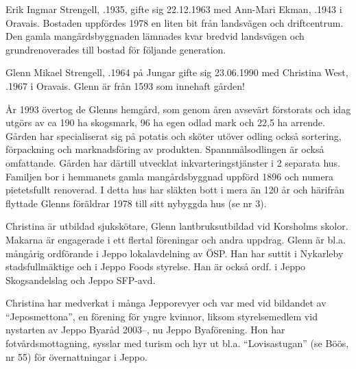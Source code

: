 
Erik Ingmar Strengell, .1935, gifte sig 22.12.1963 med Ann-Mari Ekman, .1943 i Oravais. Bostaden uppfördes 1978 en liten bit från landsvägen och driftcentrum. Den gamla mangårdsbyggnaden lämnades kvar bredvid landsvägen och grundrenoverades till bostad för följande generation.\jhvspace{}






Glenn Mikael Strengell, .1964 på Jungar gifte sig 23.06.1990 med Christina West, .1967 i  Oravais. Glenn är  från 1593 som innehaft gården!

År 1993 övertog de Glenns hemgård, som genom åren avsevärt förstorats och idag utgörs av ca 190 ha skogsmark, 96 ha egen odlad mark och 22,5 ha arrende. Gården har specialiserat sig på potatis och sköter utöver odling också sortering, förpackning och marknadsföring av produkten. Spannmålsodlingen är också omfattande. Gården har därtill utvecklat inkvarteringstjänster i 2 separata hus. Familjen bor i hemmanets gamla mangårdsbyggnad uppförd 1896 och numera pietetsfullt renoverad. I detta hus har släkten bott i mera än 120 år och härifrån flyttade Glenns föräldrar 1978 till sitt nybyggda hus (se nr 3).

Christina är utbildad sjukskötare, Glenn lantbruksutbildad vid Korsholms skolor. Makarna är engagerade i ett flertal föreningar och andra uppdrag. Glenn är bl.a. mångårig ordförande i Jeppo lokalavdelning av ÖSP. Han har suttit i Nykarleby stadsfullmäktige och i Jeppo Foods styrelse. Han är också ordf. i Jeppo Skogsandelslag och Jeppo SFP-avd.

Christina har medverkat i många Jepporevyer och var med vid bildandet av ``Jeposmettona'', en förening för yngre kvinnor, liksom styrelsemedlem vid nystarten av Jeppo Byaråd 2003--, nu Jeppo Byaförening. Hon har fotvårdsmottagning, sysslar med turism och hyr ut bl.a. ``Lovisastugan'' (se Böös, nr 55) för övernattningar i Jeppo.
\begin{jhchildren}
  \item {}
  \item {}
  \item {}
  \item {}
\end{jhchildren}


